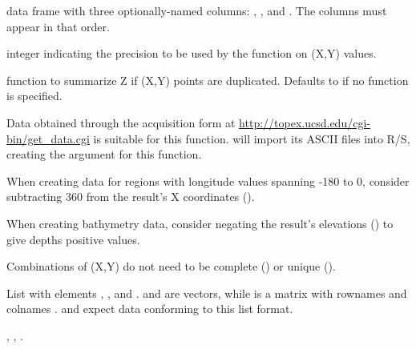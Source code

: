 \documentclass[letterpaper]{book}
\begin{document}
%
\begin{Arguments}
\begin{ldescription}
\item[\code{dat}] data frame with three optionally-named columns: ,
, and .  The columns must appear in that order.
\item[\code{digits}] integer indicating the precision to be used by the function
 on (X,Y) values.
\item[\code{func}] function to summarize Z if (X,Y) points are duplicated. 
Defaults to  if no function is specified.
\end{ldescription}
\end{Arguments}
%
\begin{Details}\relax
Data obtained through the acquisition form at
\url{http://topex.ucsd.edu/cgi-bin/get_data.cgi} is suitable for this
function.   will import its ASCII files into
R/S, creating the  argument for this function.

When creating data for regions with longitude values spanning
-180\eqn{^\circ}{} to 0\eqn{^\circ}{}, consider
subtracting 360 from the result's X coordinates ().

When creating bathymetry data, consider negating the result's
elevations () to give depths positive values.

Combinations of (X,Y) do not need to be complete () or 
unique ().
\end{Details}
%
\begin{Value}
List with elements , , and .   and
 are vectors, while  is a matrix with rownames 
and colnames .
 and  expect data
conforming to this list format.
\end{Value}
%
\begin{SeeAlso}\relax
{}, ,
.
\end{SeeAlso}
%
\end{document}
